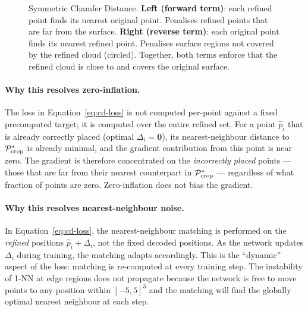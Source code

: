 \begin{figure}[t]
\caption{%
  Symmetric Chamfer Distance.
  \textbf{Left (forward term)}: each refined point finds its nearest original point.
  Penalises refined points that are far from the surface.
  \textbf{Right (reverse term)}: each original point finds its nearest refined point.
  Penalises surface regions not covered by the refined cloud (circled).
  Together, both terms enforce that the refined cloud is close to and covers
  the original surface.
}
\label{fig:chamfer-diagram}
\end{figure}

\paragraph{Why this resolves zero-inflation.}
The loss in Equation~\ref{eq:cd-loss} is not computed per-point against a
fixed precomputed target; it is computed over the entire refined set.
For a point $\hat{p}_i$ that is already correctly placed (optimal
$\Delta_i = \mathbf{0}$), its nearest-neighbour distance to $\mathcal{P}^*_{\text{crop}}$
is already minimal, and the gradient contribution from this point is near zero.
The gradient is therefore concentrated on the \emph{incorrectly placed}
points --- those that are far from their nearest counterpart in $\mathcal{P}^*_{\text{crop}}$ ---
regardless of what fraction of points are zero.
Zero-inflation does not bias the gradient.

\paragraph{Why this resolves nearest-neighbour noise.}
In Equation~\ref{eq:cd-loss}, the nearest-neighbour matching is performed
on the \emph{refined} positions $\hat{p}_i + \Delta_i$, not the fixed
decoded positions.
As the network updates $\Delta_i$ during training, the matching adapts
accordingly.
This is the ``dynamic'' aspect of the loss: matching is re-computed at
every training step.
The instability of 1-NN at edge regions does not propagate because the
network is free to move points to any position within $[-5, 5]^3$ and the
matching will find the globally optimal nearest neighbour at each step.

